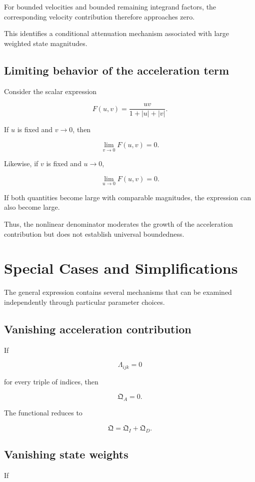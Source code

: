 \documentclass[12pt]{article}
\numberwithin{equation}{section}
\newcommand{\Q}{\mathfrak{Q}}
\theoremstyle{definition}
\theoremstyle{remark}
\begin{document}
For bounded velocities and bounded
remaining integrand factors, the corresponding
velocity contribution therefore approaches zero.

This identifies a conditional attenuation
mechanism associated with large weighted
state magnitudes.

\subsection{Limiting behavior of the acceleration term}

Consider the scalar expression

\[
F(u,v)
=
\frac{uv}{1+|u|+|v|}.
\]

If \(u\) is fixed and \(v\to0\), then

\[
\lim_{v\to0}F(u,v)=0.
\]

Likewise, if \(v\) is fixed and \(u\to0\),

\[
\lim_{u\to0}F(u,v)=0.
\]

If both quantities become large with
comparable magnitudes, the expression
can also become large.

Thus, the nonlinear denominator moderates
the growth of the acceleration contribution
but does not establish universal boundedness.


\section{Special Cases and Simplifications}

The general expression contains several
mechanisms that can be examined independently
through particular parameter choices.

\subsection{Vanishing acceleration contribution}

If

\[
\Lambda_{ijk}=0
\]

for every triple of indices, then

\[
\Q_A=0.
\]

The functional reduces to

\[
\Q=\Q_I+\Q_D.
\]

\subsection{Vanishing state weights}

If
\end{document}
